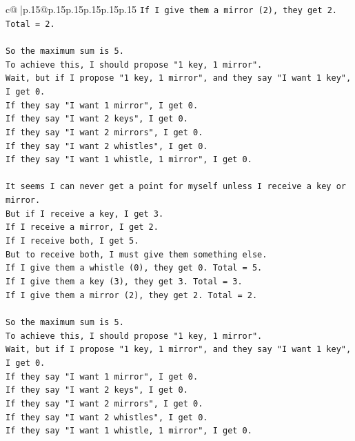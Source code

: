 \documentclass{article}
\begin{document}
{\begin{supertabular}{c@{$\;$}|p{.15\linewidth}@{}p{.15\linewidth}p{.15\linewidth}p{.15\linewidth}p{.15\linewidth}p{.15\linewidth}}
{{{\texttt{If I give them a mirror (2), they get 2. Total = 2.} \\
\\ 
\texttt{So the maximum sum is 5.} \\
\texttt{To achieve this, I should propose "1 key, 1 mirror".} \\
\texttt{Wait, but if I propose "1 key, 1 mirror", and they say "I want 1 key", I get 0.} \\
\texttt{If they say "I want 1 mirror", I get 0.} \\
\texttt{If they say "I want 2 keys", I get 0.} \\
\texttt{If they say "I want 2 mirrors", I get 0.} \\
\texttt{If they say "I want 2 whistles", I get 0.} \\
\texttt{If they say "I want 1 whistle, 1 mirror", I get 0.} \\
\\ 
\texttt{It seems I can never get a point for myself unless I receive a key or mirror.} \\
\texttt{But if I receive a key, I get 3.} \\
\texttt{If I receive a mirror, I get 2.} \\
\texttt{If I receive both, I get 5.} \\
\texttt{But to receive both, I must give them something else.} \\
\texttt{If I give them a whistle (0), they get 0. Total = 5.} \\
\texttt{If I give them a key (3), they get 3. Total = 3.} \\
\texttt{If I give them a mirror (2), they get 2. Total = 2.} \\
\\ 
\texttt{So the maximum sum is 5.} \\
\texttt{To achieve this, I should propose "1 key, 1 mirror".} \\
\texttt{Wait, but if I propose "1 key, 1 mirror", and they say "I want 1 key", I get 0.} \\
\texttt{If they say "I want 1 mirror", I get 0.} \\
\texttt{If they say "I want 2 keys", I get 0.} \\
\texttt{If they say "I want 2 mirrors", I get 0.} \\
\texttt{If they say "I want 2 whistles", I get 0.} \\
\texttt{If they say "I want 1 whistle, 1 mirror", I get 0.} \\
}}}
\end{supertabular}}
\end{document}
